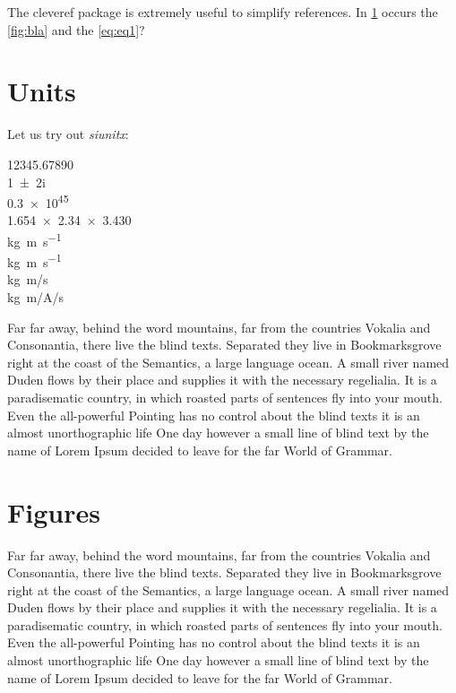 The cleveref package is extremely useful to simplify references. In
\cref{sec:units} occurs the \cref{fig:bla} and the \cref{eq:eq1}?

\section{Units}
\label{sec:units}

Let us try out \emph{siunitx}: 

\num{12345,67890} \\
\num{1+-2i}\\
\num{.3e45} \\
\num{1.654 x 2.34 x 3.430}\\
\si{kg.m.s^{-1}} \\
\si{\kilogram\metre\per\second} \\
\si[per-mode=symbol]
{\kilogram\metre\per\second} \\
\si[per-mode=symbol]
{\kilogram\metre\per\ampere\per\second}

Far far away, behind the word mountains, far from the countries Vokalia and
Consonantia, there live the blind texts. Separated they live in
Bookmarksgrove right at the coast of the Semantics, a large language
ocean. A small river named Duden flows by their place and supplies it with
the necessary regelialia. It is a paradisematic country, in which roasted
parts of sentences fly into your mouth. Even the all-powerful Pointing has
no control about the blind texts it is an almost unorthographic life One
day however a small line of blind text by the name of Lorem Ipsum decided
to leave for the far World of Grammar.

\section{Figures}
\label{sec:figures}

Far far away, behind the word mountains, far from the countries Vokalia and
Consonantia, there live the blind texts. Separated they live in
Bookmarksgrove right at the coast of the Semantics, a large language
ocean. A small river named Duden flows by their place and supplies it with
the necessary regelialia. It is a paradisematic country, in which roasted
parts of sentences fly into your mouth. Even the all-powerful Pointing has
no control about the blind texts it is an almost unorthographic life One
day however a small line of blind text by the name of Lorem Ipsum decided
to leave for the far World of Grammar.

